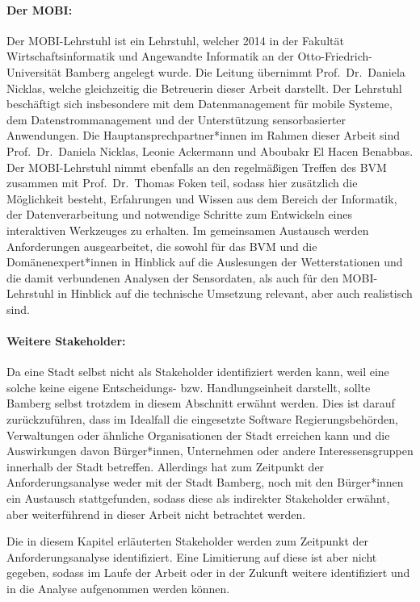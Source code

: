 \paragraph{Der \ac{MOBI}:}
Der \ac{MOBI}-Lehrstuhl ist ein Lehrstuhl, welcher 2014 in der Fakultät Wirtschaftsinformatik und Angewandte Informatik an der Otto-Friedrich-Universität Bamberg angelegt wurde. Die Leitung übernimmt Prof.\ Dr.\ Daniela Nicklas, welche gleichzeitig die Betreuerin dieser Arbeit darstellt. Der Lehrstuhl beschäftigt sich insbesondere mit dem Datenmanagement für mobile Systeme, dem Datenstrommanagement und der Unterstützung sensorbasierter Anwendungen. Die Hauptansprechpartner*innen im Rahmen dieser Arbeit sind Prof.\ Dr.\ Daniela Nicklas, Leonie Ackermann und Aboubakr El Hacen Benabbas. \\ Der \ac{MOBI}-Lehrstuhl nimmt ebenfalls an den regelmäßigen Treffen des \ac{BVM} zusammen mit Prof.\ Dr.\ Thomas Foken teil, sodass hier zusätzlich die Möglichkeit besteht, Erfahrungen und Wissen aus dem Bereich der Informatik, der Datenverarbeitung und notwendige Schritte zum Entwickeln eines interaktiven Werkzeuges zu erhalten. Im gemeinsamen Austausch werden Anforderungen ausgearbeitet, die sowohl für das \ac{BVM} und die Domänenexpert*innen in Hinblick auf die Auslesungen der Wetterstationen und die damit verbundenen Analysen der Sensordaten, als auch für den \ac{MOBI}-Lehrstuhl in Hinblick auf die technische Umsetzung relevant, aber auch realistisch sind.

\paragraph{Weitere Stakeholder:}
Da eine Stadt selbst nicht als Stakeholder identifiziert werden kann, weil eine solche keine eigene Entscheidungs- bzw. Handlungseinheit darstellt, sollte Bamberg selbst trotzdem in diesem Abschnitt erwähnt werden. Dies ist darauf zurückzuführen, dass im Idealfall die eingesetzte Software Regierungsbehörden, Verwaltungen oder ähnliche Organisationen der Stadt erreichen kann und die Auswirkungen davon Bürger*innen, Unternehmen oder andere Interessensgruppen innerhalb der Stadt betreffen. Allerdings hat zum Zeitpunkt der Anforderungsanalyse weder mit der Stadt Bamberg, noch mit den Bürger*innen ein Austausch stattgefunden, sodass diese als indirekter Stakeholder erwähnt, aber weiterführend in dieser Arbeit nicht betrachtet werden.

Die in diesem Kapitel erläuterten Stakeholder werden zum Zeitpunkt der Anforderungsanalyse identifiziert. Eine Limitierung auf diese ist aber nicht gegeben, sodass im Laufe der Arbeit oder in der Zukunft weitere identifiziert und in die Analyse aufgenommen werden können.

